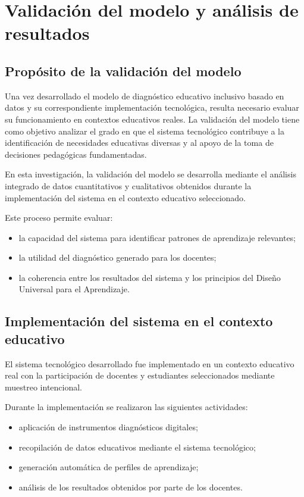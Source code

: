 \chapter{Validación del modelo y análisis de resultados}

\begin{refsection}


\section{Propósito de la validación del modelo}

Una vez desarrollado el modelo de diagnóstico educativo inclusivo basado en datos y su correspondiente implementación tecnológica, resulta necesario evaluar su funcionamiento en contextos educativos reales. La validación del modelo tiene como objetivo analizar el grado en que el sistema tecnológico contribuye a la identificación de necesidades educativas diversas y al apoyo de la toma de decisiones pedagógicas fundamentadas.

En esta investigación, la validación del modelo se desarrolla mediante el análisis integrado de datos cuantitativos y cualitativos obtenidos durante la implementación del sistema en el contexto educativo seleccionado.

Este proceso permite evaluar:

\begin{itemize}
\item la capacidad del sistema para identificar patrones de aprendizaje relevantes;
\item la utilidad del diagnóstico generado para los docentes;
\item la coherencia entre los resultados del sistema y los principios del Diseño Universal para el Aprendizaje.
\end{itemize}

\section{Implementación del sistema en el contexto educativo}

El sistema tecnológico desarrollado fue implementado en un contexto educativo real con la participación de docentes y estudiantes seleccionados mediante muestreo intencional.

Durante la implementación se realizaron las siguientes actividades:

\begin{itemize}
\item aplicación de instrumentos diagnósticos digitales;
\item recopilación de datos educativos mediante el sistema tecnológico;
\item generación automática de perfiles de aprendizaje;
\item análisis de los resultados obtenidos por parte de los docentes.
\end{itemize}


\end{refsection}
